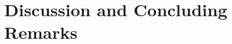 \documentclass[b5paper,11 pt]{report}
\begin{document}
	

	

	



\chapter{Discussion and Concluding Remarks} 	%
	\label{chapterComparisonAndResults}
\end{document}
